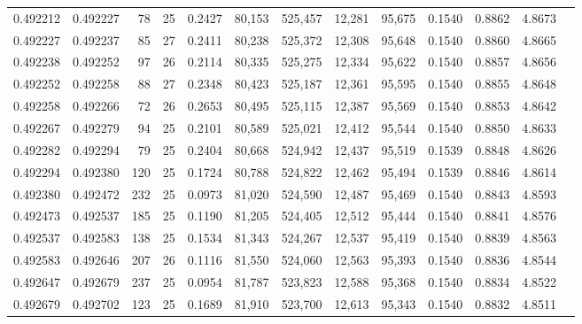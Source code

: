 \begin{tabular}{rrrrrrrrrrrrr}
0.492212 & 0.492227 &  78 &  25 &                                     0.2427 &  80,153 & 525,457 &  12,281 &  95,675 & 0.1540 & 0.8862 & 4.8673 \\
0.492227 & 0.492237 &  85 &  27 &                                     0.2411 &  80,238 & 525,372 &  12,308 &  95,648 & 0.1540 & 0.8860 & 4.8665 \\
0.492238 & 0.492252 &  97 &  26 &                                     0.2114 &  80,335 & 525,275 &  12,334 &  95,622 & 0.1540 & 0.8857 & 4.8656 \\
0.492252 & 0.492258 &  88 &  27 &                                     0.2348 &  80,423 & 525,187 &  12,361 &  95,595 & 0.1540 & 0.8855 & 4.8648 \\
0.492258 & 0.492266 &  72 &  26 &                                     0.2653 &  80,495 & 525,115 &  12,387 &  95,569 & 0.1540 & 0.8853 & 4.8642 \\
0.492267 & 0.492279 &  94 &  25 &                                     0.2101 &  80,589 & 525,021 &  12,412 &  95,544 & 0.1540 & 0.8850 & 4.8633 \\
0.492282 & 0.492294 &  79 &  25 &                                     0.2404 &  80,668 & 524,942 &  12,437 &  95,519 & 0.1539 & 0.8848 & 4.8626 \\
0.492294 & 0.492380 & 120 &  25 &                                     0.1724 &  80,788 & 524,822 &  12,462 &  95,494 & 0.1539 & 0.8846 & 4.8614 \\
0.492380 & 0.492472 & 232 &  25 &                                     0.0973 &  81,020 & 524,590 &  12,487 &  95,469 & 0.1540 & 0.8843 & 4.8593 \\
0.492473 & 0.492537 & 185 &  25 &                                     0.1190 &  81,205 & 524,405 &  12,512 &  95,444 & 0.1540 & 0.8841 & 4.8576 \\
0.492537 & 0.492583 & 138 &  25 &                                     0.1534 &  81,343 & 524,267 &  12,537 &  95,419 & 0.1540 & 0.8839 & 4.8563 \\
0.492583 & 0.492646 & 207 &  26 &                                     0.1116 &  81,550 & 524,060 &  12,563 &  95,393 & 0.1540 & 0.8836 & 4.8544 \\
0.492647 & 0.492679 & 237 &  25 &                                     0.0954 &  81,787 & 523,823 &  12,588 &  95,368 & 0.1540 & 0.8834 & 4.8522 \\
0.492679 & 0.492702 & 123 &  25 &                                     0.1689 &  81,910 & 523,700 &  12,613 &  95,343 & 0.1540 & 0.8832 & 4.8511 \\

\end{tabular}
